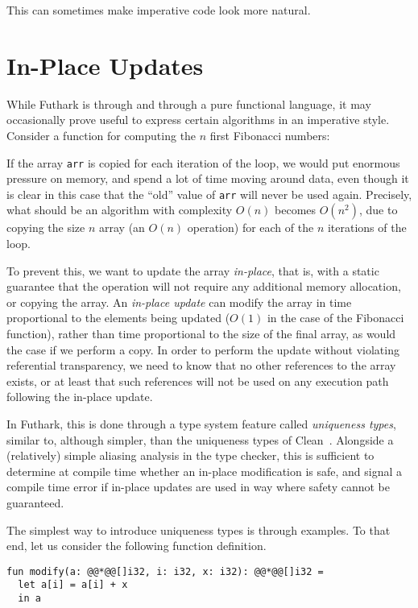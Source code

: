 \documentclass[oneside,11pt]{book}
\begin{document}
This can sometimes make imperative code look more natural.

\section{In-Place Updates}
\label{sec:in-place-updates}

While Futhark is through and through a pure functional language, it
may occasionally prove useful to express certain algorithms in an
imperative style.  Consider a function for computing the $n$ first
Fibonacci numbers:



If the array \texttt{arr} is copied for each iteration of the loop, we
would put enormous pressure on memory, and spend a lot of time moving
around data, even though it is clear in this case that the ``old''
value of \texttt{arr} will never be used again.  Precisely, what
should be an algorithm with complexity $O(n)$ becomes $O(n^2)$, due to
copying the size $n$ array (an $O(n)$ operation) for each of the $n$
iterations of the loop.

To prevent this, we want to update the array \textit{in-place}, that
is, with a static guarantee that the operation will not require any
additional memory allocation, or copying the array.  An
\textit{in-place update} can modify the array in time proportional to
the elements being updated ($O(1)$ in the case of the Fibonacci
function), rather than time proportional to the size of the final
array, as would the case if we perform a copy.  In order to perform
the update without violating referential transparency, we need to know
that no other references to the array exists, or at least that such
references will not be used on any execution path following the
in-place update.

In Futhark, this is done through a type system feature called
\textit{uniqueness types}, similar to, although simpler, than the
uniqueness types of
Clean~\cite{clean-uniqueness-types,barendsen1996uniqueness}.
Alongside a (relatively) simple aliasing analysis in the type checker,
this is sufficient to determine at compile time whether an in-place
modification is safe, and signal a compile time error if in-place
updates are used in way where safety cannot be guaranteed.

The simplest way to introduce uniqueness types is through examples.
To that end, let us consider the following function definition.

\begin{lstlisting}
fun modify(a: @@*@@[]i32, i: i32, x: i32): @@*@@[]i32 =
  let a[i] = a[i] + x
  in a
\end{lstlisting}
\end{document}
